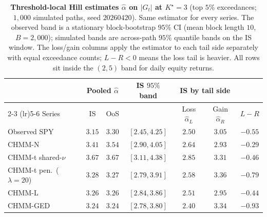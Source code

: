 \begin{table}[!htbp]
\centering
\small
\caption{\textbf{Threshold-local Hill estimates $\hat\alpha$ on $|G_t|$ at $K^\star = 3$} (top $5\%$ exceedances; $1{,}000$ simulated paths, seed $20260420$). Same estimator for every series. The observed band is a stationary block-bootstrap $95\%$ CI (mean block length $10$, $B = 2{,}000$); simulated bands are across-path $95\%$ quantile bands on the IS window. The loss/gain columns apply the estimator to each tail side separately with equal exceedance counts; $L - R < 0$ means the loss tail is heavier. All rows sit inside the \citet{cont2001empirical} $(2, 5)$ band for daily equity returns.}
\label{tab:tail_index}
\begin{tabular}{l cc c cc c}
\toprule
& \multicolumn{2}{c}{Pooled $\hat\alpha$} & IS $95\%$ band & \multicolumn{2}{c}{IS by tail side} & \\
\cmidrule(lr){2-3} \cmidrule(lr){5-6}
Series & IS & OoS & & Loss $\hat\alpha_L$ & Gain $\hat\alpha_R$ & $L - R$ \\
\midrule
Observed SPY            & $3.15$ & $3.30$ & $[2.45, 4.25]$ & $2.50$ & $3.05$ & $-0.55$ \\
CHMM-N                  & $3.41$ & $3.54$ & $[2.90, 4.05]$ & $2.64$ & $2.93$ & $-0.29$ \\
CHMM-t shared-$\nu$     & $3.67$ & $3.67$ & $[3.11, 4.38]$ & $2.85$ & $3.31$ & $-0.46$ \\
CHMM-t pen.\ ($\lambda = 20$) & $3.28$ & $3.27$ & $[2.79, 3.91]$ & $2.58$ & $3.36$ & $-0.79$ \\
CHMM-L                  & $3.26$ & $3.26$ & $[2.84, 3.86]$ & $2.51$ & $2.95$ & $-0.44$ \\
CHMM-GED                & $3.24$ & $3.24$ & $[2.78, 3.80]$ & $2.40$ & $3.34$ & $-0.93$ \\
\bottomrule
\end{tabular}
\end{table}

